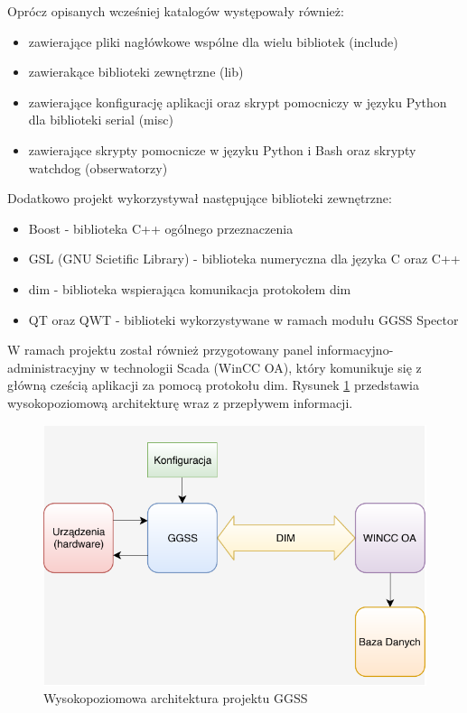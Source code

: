 \par Oprócz opisanych wcześniej katalogów występowały również:
\begin{itemize}
\item zawierające pliki nagłówkowe wspólne dla wielu bibliotek (include)
\item zawierakące biblioteki zewnętrzne (lib)
\item zawierające konfigurację aplikacji oraz skrypt pomocniczy w języku Python dla biblioteki serial (misc)
\item zawierające skrypty pomocnicze w języku Python i Bash oraz skrypty watchdog (obserwatorzy)
\end{itemize}

\par Dodatkowo projekt wykorzystywał następujące biblioteki zewnętrzne:
\begin{itemize}
\item Boost - biblioteka C++ ogólnego przeznaczenia
\item GSL (GNU Scietific Library) - biblioteka numeryczna dla języka C oraz C++
\item dim - biblioteka wspierająca komunikacja protokołem dim
\item QT oraz QWT - biblioteki wykorzystywane w ramach modułu GGSS Spector
\end{itemize}

W ramach projektu został również przygotowany panel informacyjno-administracyjny w technologii Scada (WinCC OA), który komunikuje się z główną cześcią aplikacji za pomocą protokołu dim. Rysunek \ref{fig:highLevelArch} przedstawia wysokopoziomową architekturę wraz z przepływem informacji.

\begin{figure}[H]
\centering
\caption{Wysokopoziomowa architektura projektu GGSS}
\label{fig:highLevelArch}
\includegraphics[width=\textwidth]{res/highLevelArch}
\end{figure}


